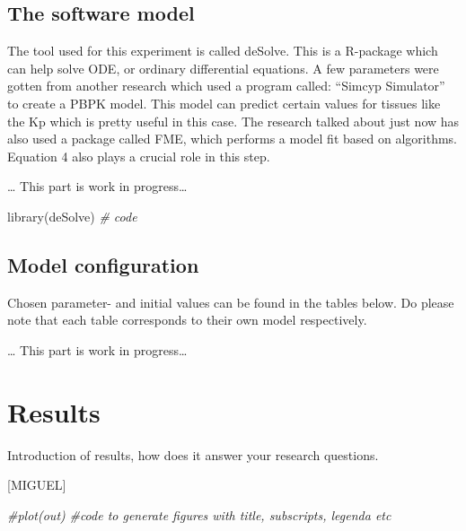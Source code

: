 \documentclass[
]{article}
\newenvironment{Shaded}{\begin{snugshade}}{\end{snugshade}}
\newcommand{\CommentTok}[1]{\textcolor[rgb]{0.56,0.35,0.01}{\textit{#1}}}
\newcommand{\FunctionTok}[1]{\textcolor[rgb]{0.00,0.00,0.00}{#1}}
\newcommand{\NormalTok}[1]{#1}
\begin{document}
\hypertarget{the-software-model}{%
\subsection{The software model}\label{the-software-model}}

The tool used for this experiment is called deSolve. This is a R-package
which can help solve ODE, or ordinary differential equations. A few
parameters were gotten from another research which used a program
called: ``Simcyp Simulator'' to create a PBPK model. This model can
predict certain values for tissues like the Kp which is pretty useful in
this case. The research talked about just now has also used a package
called FME, which performs a model fit based on algorithms. Equation 4
also plays a crucial role in this step.

\ldots{} This part is work in progress\ldots{}

\begin{Shaded}
\begin{Highlighting}[]
\FunctionTok{library}\NormalTok{(deSolve)}
\CommentTok{\# code}
\end{Highlighting}
\end{Shaded}

\hypertarget{model-configuration}{%
\subsection{Model configuration}\label{model-configuration}}

Chosen parameter- and initial values can be found in the tables below.
Do please note that each table corresponds to their own model
respectively.

\ldots{} This part is work in progress\ldots{}

\hypertarget{results}{%
\section{Results}\label{results}}

Introduction of results, how does it answer your research questions.

{[}MIGUEL{]}

\begin{Shaded}
\begin{Highlighting}[]
\CommentTok{\#plot(out)}
\CommentTok{\#code to generate figures with title, subscripts, legenda etc}
\end{Highlighting}
\end{Shaded}
\end{document}
